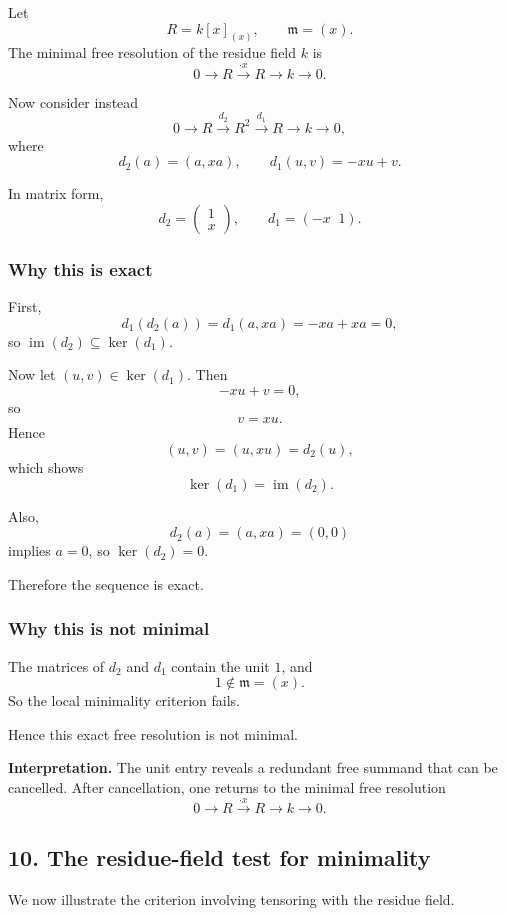 \documentclass[12pt,a4paper]{article}
\theoremstyle{notespace}
\theoremstyle{definition}
\begin{document}
Let
\[
R=k[x]_{(x)},
\qquad
\mathfrak m=(x).
\]
The minimal free resolution of the residue field \(k\) is
\[
0 \longrightarrow R \xrightarrow{\cdot x} R \longrightarrow k \longrightarrow 0.
\]

Now consider instead
\[
0 \longrightarrow R \xrightarrow{d_2} R^2 \xrightarrow{d_1} R \longrightarrow k \longrightarrow 0,
\]
where
\[
d_2(a)=(a,xa),
\qquad
d_1(u,v)=-xu+v.
\]

In matrix form,
\[
d_2=
\begin{pmatrix}
	1\\
	x
\end{pmatrix},
\qquad
d_1=
(-x\;\;1).
\]

\subsubsection*{Why this is exact}

First,
\[
d_1(d_2(a)) = d_1(a,xa)= -xa+xa=0,
\]
so \(\operatorname{im}(d_2)\subseteq \ker(d_1)\).

Now let \((u,v)\in \ker(d_1)\). Then
\[
-xu+v=0,
\]
so
\[
v=xu.
\]
Hence
\[
(u,v)=(u,xu)=d_2(u),
\]
which shows
\[
\ker(d_1)=\operatorname{im}(d_2).
\]

Also,
\[
d_2(a)=(a,xa)=(0,0)
\]
implies \(a=0\), so \(\ker(d_2)=0\).

Therefore the sequence is exact.

\subsubsection*{Why this is not minimal}

The matrices of \(d_2\) and \(d_1\) contain the unit \(1\), and
\[
1\notin \mathfrak m=(x).
\]
So the local minimality criterion fails.

Hence this exact free resolution is not minimal.

\medskip

\textbf{Interpretation.}
The unit entry reveals a redundant free summand that can be cancelled.
After cancellation, one returns to the minimal free resolution
\[
0 \longrightarrow R \xrightarrow{\cdot x} R \longrightarrow k \longrightarrow 0.
\]

\subsection{10. The residue-field test for minimality}

We now illustrate the criterion involving tensoring with the residue field.
\end{document}
